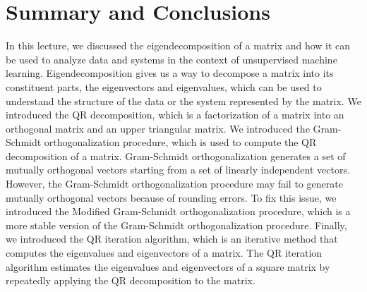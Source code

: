 \documentclass{article}[12pt]
\begin{document}
\section{Summary and Conclusions}
In this lecture, we discussed the eigendecomposition of a matrix and how it can be used to analyze data and systems in the context of unsupervised machine learning.
Eigendecomposition gives us a way to decompose a matrix into its constituent parts, the eigenvectors and eigenvalues, which can be used to understand the structure of the data or the system represented by the matrix.
We introduced the QR decomposition, which is a factorization of a matrix into an orthogonal matrix and an upper triangular matrix.
We introduced the Gram-Schmidt orthogonalization procedure, which is used to compute the QR decomposition of a matrix.
Gram-Schmidt orthogonalization generates a set of mutually orthogonal vectors starting from a set of linearly independent vectors.
However, the Gram-Schmidt orthogonalization procedure may fail to generate mutually orthogonal vectors because of rounding errors.
To fix this issue, we introduced the Modified Gram-Schmidt orthogonalization procedure, which is a more stable version of the Gram-Schmidt orthogonalization procedure.
Finally, we introduced the QR iteration algorithm, which is an iterative method that computes the eigenvalues and eigenvectors of a matrix.
The QR iteration algorithm estimates the eigenvalues and eigenvectors of a square matrix by repeatedly applying the QR decomposition to the matrix.


\end{document}
